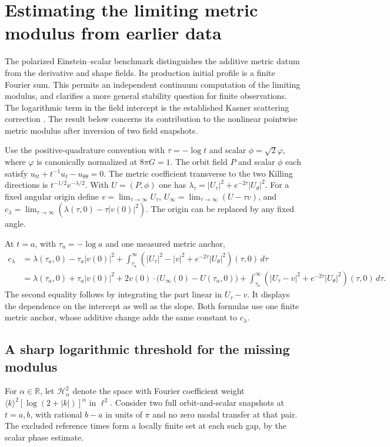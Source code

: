 \section{Estimating the limiting metric modulus from earlier data}
\label{sec:metric-modulus}
The polarized Einstein--scalar benchmark distinguishes the
additive metric datum from the derivative and shape fields.
Its production initial profile is a finite Fourier sum.
This permits an independent continuum computation of the
limiting modulus, and clarifies a more general stability
question for finite observations. The logarithmic term in
the field intercept is the established Kasner scattering
correction \cite[Theorem~1.3 and Section~1.4]{li}.
The result below concerns its contribution to the nonlinear
pointwise metric modulus after inversion of two field
snapshots.

Use the positive-quadrature convention with
$\tau=-\log t$ and scalar $\phi=\sqrt2\varphi$, where
$\varphi$ is canonically normalized at $8\pi G=1$.
The orbit field $P$ and scalar $\phi$ each satisfy
$u_{tt}+t^{-1}u_t-u_{\theta\theta}=0$.
The metric coefficient transverse to the two
Killing directions is $t^{-1/2}e^{-\lambda/2}$.
With $U=(P,\phi)$ one has
$\lambda_\tau=|U_\tau|^2+e^{-2\tau}|U_\theta|^2$.
For a fixed angular origin define
$v=\lim_{\tau\to\infty}U_\tau$,
$U_\infty=\lim_{\tau\to\infty}(U-\tau v)$,
and $c_\lambda=\lim_{\tau\to\infty}(\lambda(\tau,0)-\tau|v(0)|^2)$.
The origin can be replaced by any fixed angle.

At $t=a$, with $\tau_a=-\log a$ and one measured metric anchor,
\begin{align}
 c_\lambda
 &=\lambda(\tau_a,0)-\tau_a|v(0)|^2
   +\int_{\tau_a}^\infty
     \left(|U_\tau|^2-|v|^2+e^{-2\tau}|U_\theta|^2\right)(\tau,0)
     \,d\tau \nonumber\\
 &=\lambda(\tau_a,0)+\tau_a|v(0)|^2
     +2v(0)\cdot\big(U_\infty(0)-U(\tau_a,0)\big)
     +\int_{\tau_a}^\infty
        \left(|U_\tau-v|^2+e^{-2\tau}|U_\theta|^2\right)(\tau,0)
        \,d\tau .
 \label{eq:modulus-identity}
\end{align}
The second equality follows by integrating the part
linear in $U_\tau-v$. It displays the dependence on
the intercept as well as the slope. Both formulas
use one finite metric anchor, whose additive change
adds the same constant to $c_\lambda$.

\subsection{A sharp logarithmic threshold for the missing modulus}
For $\alpha\in\mathbb R$, let $\mathcal H^2_\alpha$
denote the space with Fourier coefficient weight
$\langle k\rangle^2[\log(2+|k|)]^\alpha$ in $\ell^2$.
Consider two full orbit-and-scalar snapshots at
$t=a,b$, with rational $b-a$ in units of $\pi$
and no zero modal transfer at that pair.
The excluded reference times form a locally finite
set at each such gap, by the scalar phase estimate.

